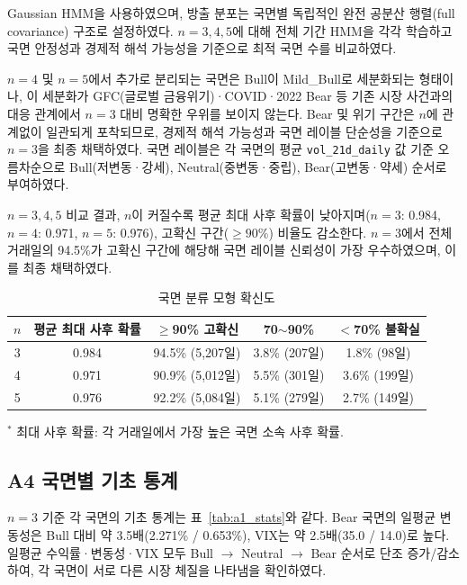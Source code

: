 \documentclass{article}
\begin{document}
Gaussian HMM을 사용하였으며, 방출 분포는 국면별 독립적인 완전 공분산 행렬(full covariance) 구조로 설정하였다. $n = 3, 4, 5$에 대해 전체 기간 HMM을 각각 학습하고 국면 안정성과 경제적 해석 가능성을 기준으로 최적 국면 수를 비교하였다.

$n = 4$ 및 $n = 5$에서 추가로 분리되는 국면은 Bull이 Mild\_Bull로 세분화되는 형태이나, 이 세분화가 GFC(글로벌 금융위기)·COVID·2022 Bear 등 기존 시장 사건과의 대응 관계에서 $n = 3$ 대비 명확한 우위를 보이지 않는다. Bear 및 위기 구간은 $n$에 관계없이 일관되게 포착되므로, 경제적 해석 가능성과 국면 레이블 단순성을 기준으로 $n = 3$을 최종 채택하였다. 국면 레이블은 각 국면의 평균 \texttt{vol\_21d\_daily} 값 기준 오름차순으로 Bull(저변동·강세), Neutral(중변동·중립), Bear(고변동·약세) 순서로 부여하였다.

$n = 3, 4, 5$ 비교 결과, $n$이 커질수록 평균 최대 사후 확률이 낮아지며($n=3$: 0.984, $n=4$: 0.971, $n=5$: 0.976), 고확신 구간($\geq 90\%$) 비율도 감소한다. $n = 3$에서 전체 거래일의 94.5\%가 고확신 구간에 해당해 국면 레이블 신뢰성이 가장 우수하였으며, 이를 최종 채택하였다.

\begin{table}[ht]
\centering
\caption{국면 분류 모형 확신도}
\label{tab:a1_confidence}
\begin{tabular}{ccccc}
\toprule
\textbf{$n$} & \textbf{평균 최대 사후 확률} & \textbf{$\geq$90\% 고확신} & \textbf{70$\sim$90\%} & \textbf{$<$70\% 불확실} \\
\midrule
3 & 0.984 & 94.5\% (5,207일) & 3.8\% (207일) & 1.8\% (98일) \\
4 & 0.971 & 90.9\% (5,012일) & 5.5\% (301일) & 3.6\% (199일) \\
5 & 0.976 & 92.2\% (5,084일) & 5.1\% (279일) & 2.7\% (149일) \\
\bottomrule
\end{tabular}
\begin{flushleft}
{\small $^*$ 최대 사후 확률: 각 거래일에서 가장 높은 국면 소속 사후 확률.}
\end{flushleft}
\end{table}

\subsection*{A4 국면별 기초 통계}

$n = 3$ 기준 각 국면의 기초 통계는 표~\ref{tab:a1_stats}와 같다. Bear 국면의 일평균 변동성은 Bull 대비 약 3.5배(2.271\% / 0.653\%), VIX는 약 2.5배(35.0 / 14.0)로 높다. 일평균 수익률·변동성·VIX 모두 Bull $\rightarrow$ Neutral $\rightarrow$ Bear 순서로 단조 증가/감소하여, 각 국면이 서로 다른 시장 체질을 나타냄을 확인하였다.
\end{document}
